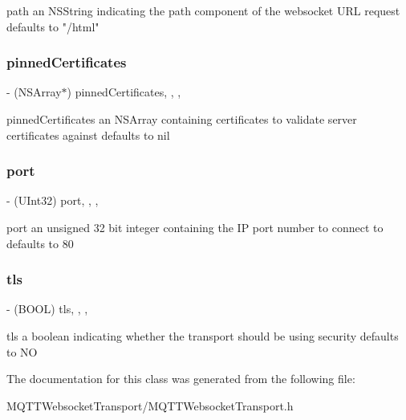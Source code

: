path an N\+S\+String indicating the path component of the websocket U\+RL request defaults to "/html" \mbox{\label{interface_m_q_t_t_websocket_transport_aaafe7397cd1c3e41240cd9752bcb446b}} 
\subsubsection{\texorpdfstring{pinned\+Certificates}{pinnedCertificates}}
{\footnotesize\ttfamily -\/ (N\+S\+Array$\ast$) pinned\+Certificates\hspace{0.3cm}{\ttfamily [read]}, {\ttfamily [write]}, {\ttfamily [nonatomic]}, {\ttfamily [strong]}}

pinned\+Certificates an N\+S\+Array containing certificates to validate server certificates against defaults to nil \mbox{\label{interface_m_q_t_t_websocket_transport_aed94b3a21446f3c4a45bbdae97095e31}} 
\subsubsection{\texorpdfstring{port}{port}}
{\footnotesize\ttfamily -\/ (U\+Int32) port\hspace{0.3cm}{\ttfamily [read]}, {\ttfamily [write]}, {\ttfamily [nonatomic]}, {\ttfamily [assign]}}

port an unsigned 32 bit integer containing the IP port number to connect to defaults to 80 \mbox{\label{interface_m_q_t_t_websocket_transport_a028dce824b120b670e0759c994066ce0}} 
\subsubsection{\texorpdfstring{tls}{tls}}
{\footnotesize\ttfamily -\/ (B\+O\+OL) tls\hspace{0.3cm}{\ttfamily [read]}, {\ttfamily [write]}, {\ttfamily [nonatomic]}, {\ttfamily [assign]}}

tls a boolean indicating whether the transport should be using security defaults to NO 

The documentation for this class was generated from the following file\+:\begin{DoxyCompactItemize}
\item 
M\+Q\+T\+T\+Websocket\+Transport/M\+Q\+T\+T\+Websocket\+Transport.\+h\end{DoxyCompactItemize}
